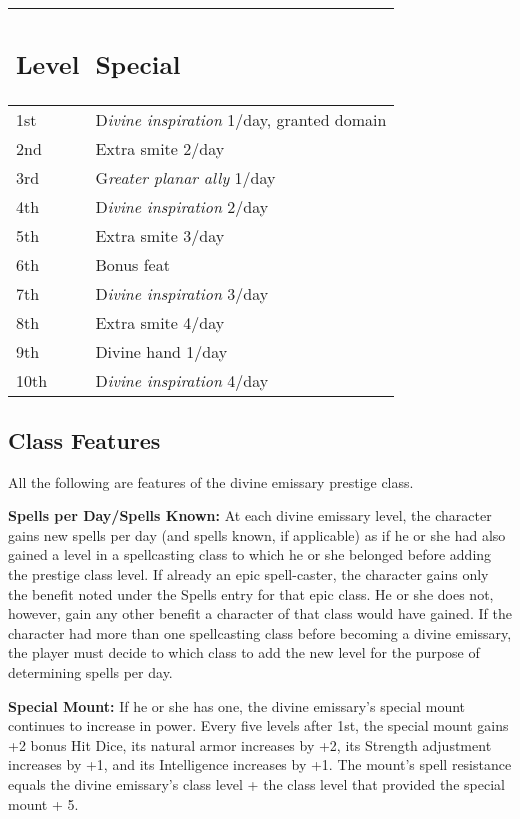 \documentclass{article}
\begin{document}
\begin{tabular}{|>{\raggedright}p{27pt}|>{\raggedright}p{171pt}|}
\hline
\subsection*{L\textbf{evel}} & \subsection*{S\textbf{pecial }}\tabularnewline
\hline
1st & D\textit{ivine inspiration }1/day, granted domain \tabularnewline
\hline
2nd & Extra smite 2/day \tabularnewline
\hline
3rd & G\textit{reater planar ally }1/day\tabularnewline
\hline
4th & D\textit{ivine inspiration }2/day \tabularnewline
\hline
5th & Extra smite 3/day \tabularnewline
\hline
6th & Bonus feat \tabularnewline
\hline
7th & D\textit{ivine inspiration }3/day \tabularnewline
\hline
8th & Extra smite 4/day \tabularnewline
\hline
9th & Divine hand 1/day \tabularnewline
\hline
10th & D\textit{ivine inspiration }4/day \tabularnewline
\hline
\end{tabular}

\vspace{12pt}
\subsection*{\textbf{Class Features}}

All the following are features of the divine emissary prestige class. 

\textbf{Spells per Day/Spells Known:} At each divine emissary level, the character 
gains new spells per day (and spells known, if applicable) as if he or she had 
also gained a level in a spellcasting class to which he or she belonged before 
adding the prestige class level. If already an epic spell-caster, the character 
gains only the benefit noted under the Spells entry for that epic class. He or 
she does not, however, gain any other benefit a character of that class would have 
gained. If the character had more than one spellcasting class before becoming a 
divine emissary, the player must decide to which class to add the new level for 
the purpose of determining spells per day. 

\textbf{Special Mount:} If he or she has one, the divine emissary's special mount 
continues to increase in power. Every five levels after 1st, the special mount 
gains +2 bonus Hit Dice, its natural armor increases by +2, its Strength adjustment 
increases by +1, and its Intelligence increases by +1. The mount's spell resistance 
equals the divine emissary's class level + the class level that provided the special 
mount + 5. 
\end{document}
